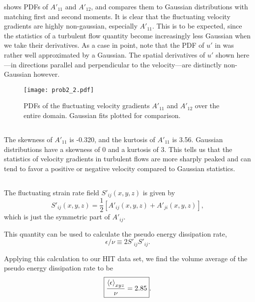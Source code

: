 \documentclass[11pt]{article}
\begin{document}
 shows PDFs of $A'_{11}$ and $A'_{12}$, and compares them to Gaussian distributions with matching first and second moments. It is clear that the fluctuating velocity gradients are highly non-gaussian, especially $A'_{11}$. This is to be expected, since the statistics of a turbulent flow quantity become increasingly less Gaussian when we take their derivatives. As a case in point, note that the PDF of $u'$ in  was rather well approximated by a Gaussian. The spatial derivatives of $u'$ shown here---in directions parallel and perpendicular to the velocity---are distinctly non-Gaussian however.

\begin{figure}[t]
\centering
\texttt{[image: prob2\_2.pdf]}
\\[6pt]
\caption{PDFs of the fluctuating velocity gradients $A'_{11}$ and $A'_{12}$ over the entire domain. Gaussian fits plotted for comparison.}
\label{fig:prob_2_2_AijPrime_PDFs}
\end{figure}

\subsection{}

The skewness of $A'_{11}$ is -0.320, and the kurtosis of $A'_{11}$ is 3.56. Gaussian distributions have a skewness of 0 and a kurtosis of 3. This tells us that the statistics of velocity gradients in turbulent flows are more sharply peaked and can tend to favor a positive or negative velocity compared to Gaussian statistics.

\subsection{}

The fluctuating strain rate field $S'_{ij}(x,y,z)$ is given by
\begin{equation}
S'_{ij}(x,y,z)
=
\frac{1}{2} \left[ A'_{ij}(x,y,z) + A'_{ji}(x,y,z) \right]
,
\end{equation}
which is just the symmetric part of $A'_{ij}$.

This quantity can be used to calculate the pseudo energy dissipation rate,
\begin{equation}
\epsilon/\nu \equiv 2 S'_{ij} S'_{ij}
.
\end{equation}

Applying this calculation to our HIT data set, we find the volume average of the pseudo energy dissipation rate to be
\[
\boxed{\frac{\left< \epsilon \right>_{xyz}}{\nu} = 2.85}
.
\]
\end{document}

